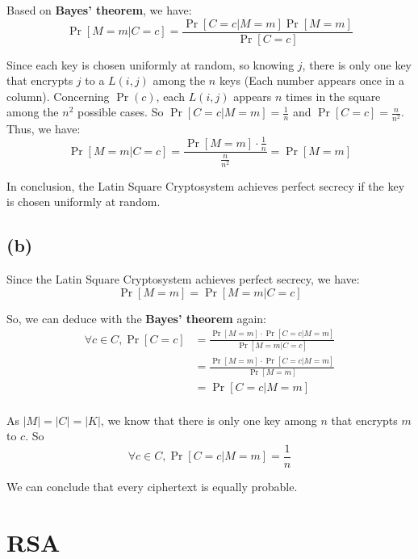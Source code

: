 \documentclass[a4paper,12pt]{article}
\begin{document}
Based on \textbf{Bayes' theorem}, we have:
\begin{equation}
    \Pr[M=m | C=c] = \frac{\Pr[C=c|M=m]\Pr[M=m]}{\Pr[C=c]}
\end{equation}

Since each key is chosen uniformly at random, so knowing $j$, there is only one key that encrypts $j$ to a $L(i, j)$ among the $n$ keys (Each number appears once in a column). Concerning $\Pr(c)$, each $L(i, j)$ appears $n$ times in the square among the $n^2$ possible cases. So $\Pr[C=c | M=m] = \frac{1}{n}$ and $\Pr[C=c] = \frac{n}{n^2}$. Thus, we have:
\begin{equation}
    \Pr[M=m | C=c] = \frac{\Pr[M=m]\cdot \frac{1}{n}}{\frac{n}{n^2}} = \Pr[M=m]
\end{equation}

In conclusion, the Latin Square Cryptosystem achieves perfect secrecy if the key is chosen uniformly at random.
\subsection{(b)}
Since the Latin Square Cryptosystem achieves perfect secrecy, we have:
\begin{equation}
    \Pr[M=m] = \Pr[M=m | C=c]
\end{equation}

So, we can deduce with the \textbf{Bayes' theorem} again:
\begin{equation}
    \begin{aligned}
        \forall c \in C, \Pr[C=c] & = \frac{\Pr[M = m]\cdot \Pr[C=c | M=m]}{\Pr[M=m | C=c]} \\
                                  & = \frac{\Pr[M = m]\cdot \Pr[C=c | M=m]}{\Pr[M=m]}       \\
                                  & = \Pr[C=c | M=m]                                        \\
    \end{aligned}
\end{equation}

As $|M| = |C| = |K|$, we know that there is only one key among $n$ that encrypts $m$ to $c$. So
\begin{equation}
    \forall c\in C, \Pr[C=c | M=m] = \frac{1}{n}
\end{equation}

We can conclude that every ciphertext is equally probable.
\section{RSA}
\end{document}
